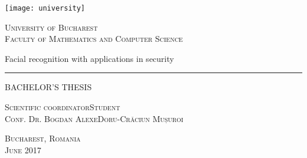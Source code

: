 \begin{titlepage}
	\begin{center}

		\texttt{[image: university]}

		\vspace{0.5cm}
		\LARGE \textsc{University of Bucharest}
		\\
		\vspace{0.5cm}
		\Large \textsc{Faculty of Mathematics and Computer Science}

		\vfill

		\Huge Facial recognition with applications in security
		\rule{\textwidth}{1pt}
		\Large BACHELOR'S THESIS

		\vfill

		\Large
		\textsc{Scientific coordinator}\hfill \textsc{Student}
		\\
		\large
		\textsc{Conf. Dr. Bogdan Alexe}\hfill \textsc{Doru-Crăciun Mușuroi}
	
		\vspace{1.5cm}
		\textsc{Bucharest, Romania}\\
		\textsc{June 2017}

	\end{center}
\end{titlepage}
 
